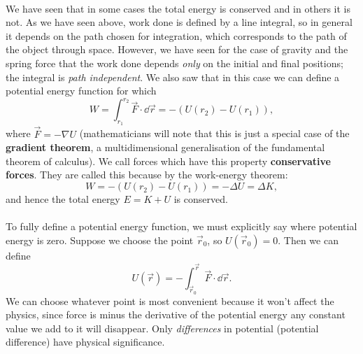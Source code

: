 \documentclass[../classical_mechanics.tex]{subfiles}
\begin{document}
        \paragraph{}
        We have seen that in some cases the total energy is conserved and in others it is not.
        As we have seen above, work done is defined by a line integral, so in general it depends on the path chosen for integration, which corresponds to the path of the object through space.
        However, we have seen for the case of gravity and the spring force that the work done depends \textit{only} on the initial and final positions; the integral is \textit{path independent}.
        We also saw that in this case we can define a potential energy function for which
        \begin{equation}
            W=\int_{r_1}^{r_2}\vec{F}\cdot\dd{\vec{r}}=-(U(r_2)-U(r_1)),
        \end{equation}
        where $\vec{F}=-\nabla U$ (mathematicians will note that this is just a special case of the \textbf{gradient theorem}, a multidimensional generalisation of the fundamental theorem of calculus).
        We call forces which have this property \textbf{conservative forces}.
        They are called this because by the work-energy theorem:
        \begin{equation}
            W=-(U(r_2)-U(r_1))=-\Delta U=\Delta K,
        \end{equation}
        and hence the total energy $E=K+U$ is conserved.

        \paragraph{}
        To fully define a potential energy function, we must explicitly say where potential energy is zero.
        Suppose we choose the point $\vec{r}_0$, so $U(\vec{r}_0)=0$.
        Then we can define
        \begin{equation}
            U(\vec{r})=-\int_{\vec{r}_0}^{\vec{r}}\vec{F}\cdot\dd{\vec{r}}.
        \end{equation}
        We can choose whatever point is most convenient because it won't affect the physics, since force is minus the derivative of the potential energy any constant value we add to it will disappear.
        Only \textit{differences} in potential (potential difference) have physical significance.
\end{document}
